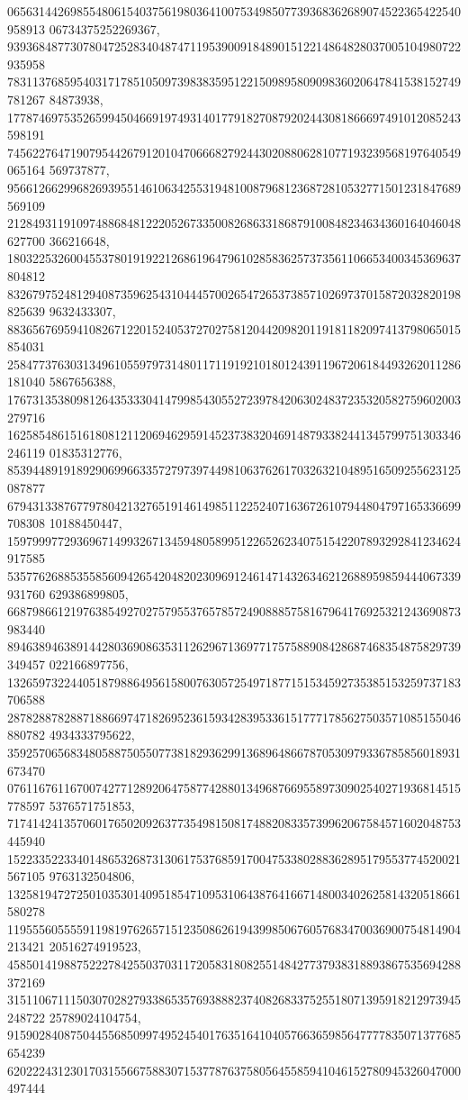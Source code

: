\documentclass[12pt]{article}
\begin{document}
065631442698554806154037561980364100753498507739368362689074522365422540958913
06734375252269367, 
939368487730780472528340487471195390091848901512214864828037005104980722935958
783113768595403171785105097398383595122150989580909836020647841538152749781267
84873938, 
177874697535265994504669197493140177918270879202443081866697491012085243598191
745622764719079544267912010470666827924430208806281077193239568197640549065164
569737877, 
956612662996826939551461063425531948100879681236872810532771501231847689569109
212849311910974886848122205267335008268633186879100848234634360164046048627700
366216648, 
180322532600455378019192212686196479610285836257373561106653400345369637804812
832679752481294087359625431044457002654726537385710269737015872032820198825639
9632433307, 
883656769594108267122015240537270275812044209820119181182097413798065015854031
258477376303134961055979731480117119192101801243911967206184493262011286181040
5867656388, 
176731353809812643533304147998543055272397842063024837235320582759602003279716
162585486151618081211206946295914523738320469148793382441345799751303346246119
01835312776, 
853944891918929069966335727973974498106376261703263210489516509255623125087877
679431338767797804213276519146149851122524071636726107944804797165336699708308
10188450447, 
159799977293696714993267134594805899512265262340751542207893292841234624917585
535776268853558560942654204820230969124614714326346212688959859444067339931760
629386899805, 
668798661219763854927027579553765785724908885758167964176925321243690873983440
894638946389144280369086353112629671369771757588908428687468354875829739349457
022166897756, 
132659732244051879886495615800763057254971877151534592735385153259737183706588
287828878288718866974718269523615934283953361517771785627503571085155046880782
4934333795622, 
359257065683480588750550773818293629913689648667870530979336785856018931673470
076116761167007427712892064758774288013496876695589730902540271936814515778597
5376571751853, 
717414241357060176502092637735498150817488208335739962067584571602048753445940
152233522334014865326873130617537685917004753380288362895179553774520021567105
9763132504806, 
132581947272501035301409518547109531064387641667148003402625814320518661580278
119555605555911981976265715123508626194399850676057683470036900754814904213421
20516274919523, 
458501419887522278425503703117205831808255148427737938318893867535694288372169
315110671115030702827933865357693888237408268337525518071395918212973945248722
25789024104754, 
915902840875044556850997495245401763516410405766365985647777835071377685654239
620222431230170315566758830715377876375805645585941046152780945326047000497444
\end{document}
